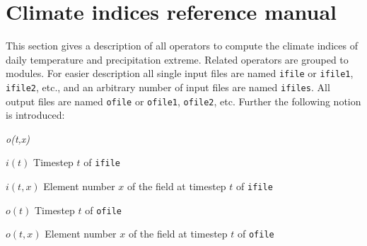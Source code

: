 \chapter{\label{refman}Climate indices reference manual}

This section gives a description of all {\CDO} operators to compute the climate indices of daily temperature and precipitation extreme.
Related operators are grouped to modules.
For easier description all single input files are named {\tt ifile} or {\tt ifile1}, {\tt ifile2}, etc.,
and an arbitrary number of input files are named {\tt ifiles}.
All output files are named {\tt ofile} or {\tt ofile1}, {\tt ofile2}, etc.
Further the following notion is introduced:
\begin{defalist}{{\em o(t,x)}}
\item[\(i(t)\)\hfill]
Timestep \(t\) of {\tt ifile}
\item[\(i(t,x)\)\hfill]
Element number \(x\) of the field at timestep \(t\) of {\tt ifile}
\item[\(o(t)\)\hfill]
Timestep \(t\) of {\tt ofile}
\item[\(o(t,x)\)\hfill]
Element number \(x\) of the field at timestep \(t\) of {\tt ofile}
\end{defalist}



\hspace{3mm}

%


